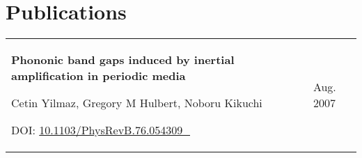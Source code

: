 \documentclass[10pt, a4paper]{article}
\let\hrefWithoutArrow\href
\renewcommand{\href}[2]{\hrefWithoutArrow{#1}{#2\, \raisebox{.1ex}{\footnotesize \faExternalLink*}}}
\begin{document}
    \section{Publications}
    
        \begin{tabularx}{\textwidth}{K{0.2 cm} R{3.6 cm}}
            \textbf{Phononic band gaps induced by inertial amplification in periodic media}
            
            Cetin Yilmaz, Gregory M Hulbert, Noboru Kikuchi

            DOI: \href{https://doi.org/10.1103/PhysRevB.76.054309}{10.1103/PhysRevB.76.054309}
            &
            Aug. 2007
        \end{tabularx}
\end{document}
